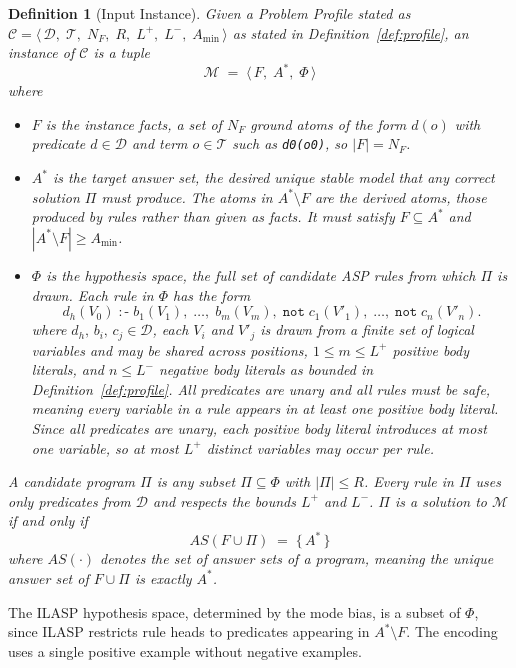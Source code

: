 \documentclass[11pt,a4paper]{article}
\newtheorem{definition}{Definition}
\begin{document}
\begin{definition}[Input Instance]
\label{def:input}
Given a Problem Profile stated as $\mathcal{C} = \langle\, \mathcal{D},\; \mathcal{T},\; N_F,\; R,\; L^+,\; L^-,\; A_{\min} \,\rangle$ as stated in Definition~\ref{def:profile}, an \emph{instance} of $\mathcal{C}$ is a tuple
\[
  \mathcal{M} \;=\; \langle\, F,\; A^{*},\; \Phi \,\rangle
\]
where
\begin{itemize}
  \item $F$ is the \emph{instance facts}, a set of $N_F$ ground atoms of the form $d(o)$ with predicate $d \in \mathcal{D}$ and term $o \in \mathcal{T}$ such as \texttt{d0(o0)}, so $|F| = N_F$.
  \item $A^{*}$ is the \emph{target answer set}, the desired unique stable model that any correct solution $\Pi$ must produce. The atoms in $A^{*} \setminus F$ are the \emph{derived atoms}, those produced by rules rather than given as facts. It must satisfy $F \subseteq A^{*}$ and $|A^{*} \setminus F| \geq A_{\min}$.
  \item $\Phi$ is the \emph{hypothesis space}, the full set of candidate ASP rules from which $\Pi$ is drawn. Each rule in $\Phi$ has the form
    \[
      d_h(V_0) \;:\text{-}\; b_1(V_1),\; \ldots,\; b_{m}(V_m),\; \texttt{not}\; c_1(V'_1),\; \ldots,\; \texttt{not}\; c_{n}(V'_n).
    \]
    where $d_h,\, b_i,\, c_j \in \mathcal{D}$, each $V_i$ and $V'_j$ is drawn from a finite set of logical variables and may be shared across positions, $1 \leq m \leq L^+$ positive body literals, and $n \leq L^-$ negative body literals as bounded in Definition~\ref{def:profile}. All predicates are unary and all rules must be safe, meaning every variable in a rule appears in at least one positive body literal. Since all predicates are unary, each positive body literal introduces at most one variable, so at most $L^+$ distinct variables may occur per rule.
\end{itemize}
A \emph{candidate program} $\Pi$ is any subset $\Pi \subseteq \Phi$ with $|\Pi| \leq R$. Every rule in $\Pi$ uses only predicates from $\mathcal{D}$ and respects the bounds $L^+$ and $L^-$.
$\Pi$ is a \emph{solution} to $\mathcal{M}$ if and only if
\[
  AS\!\left(F \cup \Pi\right) \;=\; \bigl\{\, A^{*} \,\bigr\}
\]
where $AS(\cdot)$ denotes the set of answer sets of a program, meaning the unique answer set of $F \cup \Pi$ is exactly $A^{*}$.
\end{definition}

The ILASP hypothesis space, determined by the mode bias, is a subset of $\Phi$, since ILASP restricts rule heads to predicates appearing in $A^{*} \setminus F$. The encoding uses a single positive example without negative examples.
\end{document}
